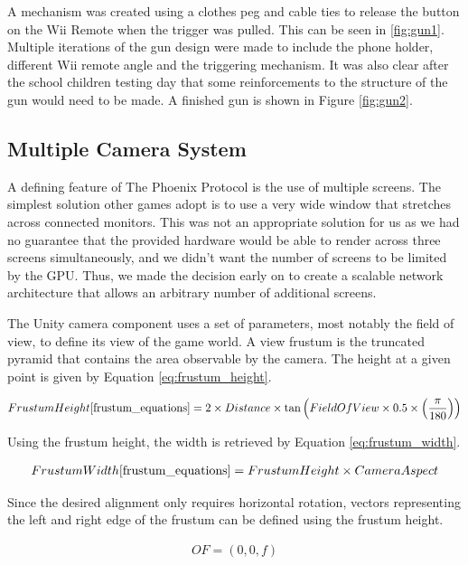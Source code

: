 \documentclass[a4paper,11pt]{article}
\begin{document}
A mechanism was created using a clothes peg and cable ties to release the button on the Wii Remote when the trigger was pulled. This can be seen in \ref{fig:gun1}. Multiple iterations of the gun design were made to include the phone holder, different Wii remote angle and the triggering mechanism. It was also clear after the school children testing day that some reinforcements to the structure of the gun would need to be made. A finished gun is shown in Figure \ref{fig:gun2}.

\subsection{Multiple Camera System}
A defining feature of The Phoenix Protocol is the use of multiple screens. The simplest solution other games adopt is to use a very wide window that stretches across connected monitors. This was not an appropriate solution for us as we had no guarantee that the provided hardware would be able to render across three screens simultaneously, and we didn't want the number of screens to be limited by the GPU. Thus, we made the decision early on to create a scalable network architecture that allows an arbitrary number of additional screens. 

The Unity camera component\cite{unity_camera} uses a set of parameters, most notably the field of view, to define its view of the game world. A view frustum \cite{unity_frustum} is the truncated pyramid that contains the area observable by the camera. The height at a given point is given by Equation \ref{eq:frustum_height}.

\begin{align}
	Frustum Height\cite{frustum_equations} = 2 \times Distance \times \tan \left( Field Of View \times 0.5 \times \left( \frac{\pi}{180} \right)\right) \label{eq:frustum_height}
\end{align}

Using the frustum height, the width is retrieved by Equation \ref{eq:frustum_width}.

\begin{align}
	Frustum Width\cite{frustum_equations} = Frustum Height \times Camera Aspect \label{eq:frustum_width}
\end{align}

Since the desired alignment only requires horizontal rotation, vectors representing the left and right edge of the frustum can be defined using the frustum height.

\begin{align*}
	OF = (0, 0, f)
\end{align*}
\end{document}
